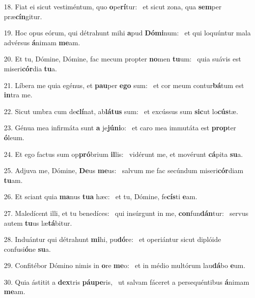18. Fiat ei sicut vestiméntum, quo \textbf{o}pe\textbf{rí}tur: \ast\  et sicut zona, qua \textbf{sem}per præ\textbf{cín}gitur.\

19. Hoc opus eórum, qui détrahunt mihi \textbf{a}pud \textbf{Dó}\textbf{mi}num: \ast\  et qui loquúntur mala advérsus \textbf{á}nimam \textbf{me}am.\

20. Et tu, Dómine, Dómine, fac mecum propter \textbf{no}men \textbf{tu}um: \ast\  quia suávis est miseri\textbf{cór}dia \textbf{tu}a.\

21. Líbera me quia egénus, et \textbf{pau}per \textbf{e}\textbf{go} sum: \ast\  et cor meum contur\textbf{bá}tum est \textbf{in}tra me.\

22. Sicut umbra cum de\textbf{clí}nat, ab\textbf{lá}\textbf{tus} sum: \ast\  et excússus sum \textbf{sic}ut lo\textbf{cús}tæ.\

23. Génua mea infirmáta sunt \textbf{a} je\textbf{jú}\textbf{ni}o: \ast\  et caro mea immutáta est \textbf{prop}ter \textbf{ó}leum.\

24. Et ego factus sum op\textbf{pró}brium \textbf{il}lis: \ast\  vidérunt me, et movérunt \textbf{cá}pita \textbf{su}a.\

25. Adjuva me, Dómine, \textbf{De}us \textbf{me}us: \ast\  salvum me fac secúndum miseri\textbf{cór}diam \textbf{tu}am.\

26. Et sciant quia \textbf{ma}nus \textbf{tu}\textbf{a} hæc: \ast\  et tu, Dómine, fe\textbf{cís}ti \textbf{e}am.\

27. Maledícent illi, et tu benedíces: \dag\  qui insúrgunt in me, \textbf{con}fun\textbf{dán}tur: \ast\  servus autem \textbf{tu}us læ\textbf{tá}bitur.\

28. Induántur qui détrahunt \textbf{mi}hi, pu\textbf{dó}re: \ast\  et operiántur sicut diplóide confusi\textbf{ó}ne \textbf{su}a.\

29. Confitébor Dómino nimis in \textbf{o}re \textbf{me}o: \ast\  et in médio multórum lau\textbf{dá}bo \textbf{e}um.\

30. Quia ástitit a \textbf{dex}tris \textbf{páu}\textbf{pe}ris, \ast\  ut salvam fáceret a persequéntibus \textbf{á}nimam \textbf{me}am.\

